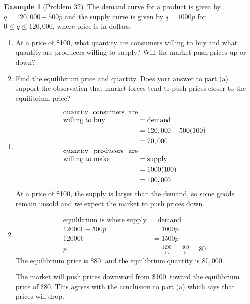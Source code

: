 \documentclass[oneside]{book}
\theoremstyle{definition}
\newtheorem{example}{Example}
\theoremstyle{solution}
\newtheorem*{solution}{Solution}
\newenvironment{solution}{\vspace{2in}\comment}{\endcomment}
\begin{document}
\begin{example}[Problem 32]
\small  The demand curve for a product is given by $q=120,000-500p$ and the
  supply curve is given by $q=1000p$ for $0\le q \le 120,000$, where price
  is in dollars.
\begin{enumerate}
\item At a price of \$100, what quantity are consumers
  willing to buy and what quantity are producers willing to supply?
  Will the market push prices up or down?
\item Find the equilibrium price and quantity. Does your answer to
  part (a) support the observation that market forces tend to push
  prices closer to the equilibrium price?
\end{enumerate}
\end{example}

\begin{solution}
\begin{enumerate}
\item 
\begin{align*}
\parbox[b]{1.5in}{quantity consumers are willing to buy}
& = \text{demand}\\
& = 120,000 - 500(100)\\
&  = 70,000\\
\parbox[b]{1.5in}{quantity producers are willing to make}
& = \text{supply}\\
& = 1000(100)\\
& = 100,000
\end{align*}
  At a price of \$100, the supply is larger than the demand, so some
  goods remain unsold and we expect the market to push prices down.

\item
\begin{align*}
\text{equilibrium is where supply} & = \text{demand}\\
120 000 - 500 p & = 1000 p \\
120 000 & = 1500 p\\
p  & = \frac{1200}{15} = \frac{400}{5} = 80 
\end{align*}
The equilibrium price is $\$80$, and the equilibrium quantity is
$ 80,000$.  
  
  The market will push prices downward from \$100, toward the
  equilibrium price of \$80. This agrees with the conclusion to part
  (a) which says that prices will drop.
\end{enumerate}
\end{solution}
\end{document}
